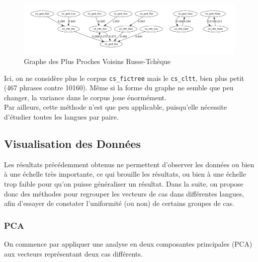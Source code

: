 \documentclass{cours}
\begin{document}
\begin{figure}[H]
	\centering
	\includegraphics[width=\textwidth]{Figures/GNN/gnn_ru_gsd_cs_cltt}
	\caption{Graphe des Plus Proches Voisins Russe-Tchèque}
	\label{GNNRuCz}
\end{figure}

Ici, on ne considère plus le corpus \texttt{cs\_fictree} mais le \texttt{cs\_cltt}, bien plus petit (467 phrases contre 10160).
Même si la forme du graphe ne semble que peu changer, la variance dans le corpus joue énormément.\\
Par ailleurs, cette méthode n'est que peu applicable, puisqu'elle nécessite d'étudier toutes les langues par paire.

\subsection{Visualisation des Données}\label{subsec:vis}
Les résultats précédemment obtenus ne permettent d'observer les données ou bien à une échelle très importante, ce qui brouille les résultats, ou bien à une échelle trop faible pour qu'on puisse généraliser un résultat.
Dans la suite, on propose donc des méthodes pour regrouper les vecteurs de cas dans différentes langues, afin d'essayer de constater l'uniformité (ou non) de certains groupes de cas.

\subsubsection{PCA}\label{subsub:pca}
On commence par appliquer une analyse en deux composantes principales (PCA) aux vecteurs représentant deux cas différents.

\end{document}
